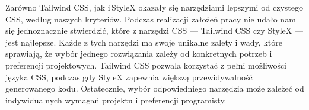\documentclass[a4paper,12pt]{book} %
\begin{document}
Zarówno Tailwind CSS, jak i\,StyleX okazały się narzędziami lepszymi od czystego CSS, według naszych kryteriów. Podczas realizacji założeń pracy nie udało nam się jednoznacznie stwierdzić, które z narzędzi CSS --- Tailwind CSS czy StyleX --- jest najlepsze. Każde z tych narzędzi ma swoje unikalne zalety i wady, które sprawiają, że wybór jednego rozwiązania zależy od konkretnych potrzeb i preferencji projektowych. Tailwind CSS pozwala korzystać z pełni możliwości języka CSS, podczas gdy StyleX zapewnia większą przewidywalność generowanego kodu. Ostatecznie, wybór odpowiedniego narzędzia może zależeć od indywidualnych wymagań projektu i preferencji programisty.

\listoffigures{} %




\end{document}
